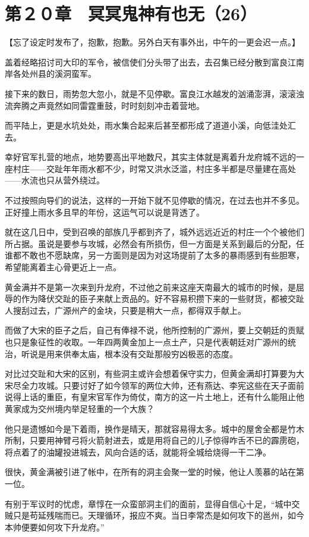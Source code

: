 \section{第２０章　冥冥鬼神有也无（26）}

【忘了设定时发布了，抱歉，抱歉。另外白天有事外出，中午的一更会迟一点。】

盖着经略招讨司大印的军令，被信使们分头带了出去，去召集已经分散到富良江南岸各处州县的溪洞蛮军。

接下来的数日，雨势忽大忽小，就是不见停歇。富良江水越发的汹涌澎湃，滚滚浊流奔腾之声竟然如同雷霆重鼓，时时刻刻冲击着营地。

而平陆上，更是水坑处处，雨水集合起来后甚至都形成了道道小溪，向低洼处汇去。

幸好官军扎营的地点，地势要高出平地数尺，其实主体就是离着升龙府城不远的一座村庄——交趾年年雨水都不少，时常又洪水泛滥，村庄多半都是尽量建在高处——水流也只从营外绕过。

不过按照向导们的说法，这样的一开始下就不见停歇的情况，在过去也并不多见。正好撞上雨水多且早的年份，这运气可以说是背透了。

就在这几日中，受到召唤的部族几乎都到齐了，城外远远近近的村庄一个个被他们所占据。虽说是要参与攻城，必然会有所损伤，但一方面是关系到最后的分配，任谁都不敢也不愿缺席，另一方面则是因为对这场提前了太多的暴雨感到有些胆寒，希望能离着主心骨更近上一点。

黄金满并不是第一次来到升龙府，不过他之前来这座天南最大的城市的时候，是屈辱的作为降伏交趾的臣子来献上贡品的。好不容易积攒下来的一些财货，都被交趾人搜刮过去，广源州产的金块，只要是稍大一点，都得双手献上。

而做了大宋的臣子之后，自己有俸禄不说，他所控制的广源州，要上交朝廷的贡赋也只是象征性的收取。一年四两黄金加上一点土产，只是代表朝廷对广源州的统治，听说是用来供奉太庙，根本没有交趾那般穷凶极恶的态度。

对比过交趾和大宋的区别，有些洞主或许会想着保守实力，但黄金满却打算要为大宋尽全力攻城。只要讨好了如今领军的两位大帅，还有燕达、李宪这些在天子面前说得上话的重臣，有皇宋官军作为倚仗，南方的这一片土地上，还有什么能阻止他黄家成为交州境内举足轻重的一个大族？

他只是遗憾如今是下着雨，换作是晴天，那就容易得太多。城中的屋舍全都是竹木所制，只要用神臂弓将火箭射进去，或是用将自己的儿子惊得咋舌不已的霹雳砲，将点着了的油罐投进城去，风向合适的话，就能将全城给烧得一干二净。

很快，黄金满被引进了帐中，在所有的洞主会聚一堂的时候，他让人羡慕的站在第一位。

有别于军议时的忧虑，章惇在一众蛮部洞主们的面前，显得自信心十足，“城中交贼只是苟延残喘而已。天理循环，报应不爽。当日李常杰是如何攻下的邕州，如今本帅便要如何攻下升龙府。”

